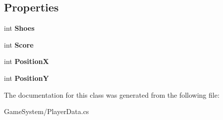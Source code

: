 \subsection*{Properties}
\begin{DoxyCompactItemize}
\item 
int {\bfseries Shoes}\hypertarget{classhoppin_1_1_game_system_1_1_player_data_a163cbc8b8331a39c8734c2c93181bcea}{}\label{classhoppin_1_1_game_system_1_1_player_data_a163cbc8b8331a39c8734c2c93181bcea}

\item 
int {\bfseries Score}\hypertarget{classhoppin_1_1_game_system_1_1_player_data_a1a62461cc0efb205a629e426c8de802c}{}\label{classhoppin_1_1_game_system_1_1_player_data_a1a62461cc0efb205a629e426c8de802c}

\item 
int {\bfseries PositionX}\hypertarget{classhoppin_1_1_game_system_1_1_player_data_a03397b504177938e1260d8497a82c2ea}{}\label{classhoppin_1_1_game_system_1_1_player_data_a03397b504177938e1260d8497a82c2ea}

\item 
int {\bfseries PositionY}\hypertarget{classhoppin_1_1_game_system_1_1_player_data_a29bcc9b579aeaf3c125249a5edef4666}{}\label{classhoppin_1_1_game_system_1_1_player_data_a29bcc9b579aeaf3c125249a5edef4666}

\end{DoxyCompactItemize}


The documentation for this class was generated from the following file\+:\begin{DoxyCompactItemize}
\item 
Game\+System/Player\+Data.\+cs\end{DoxyCompactItemize}
